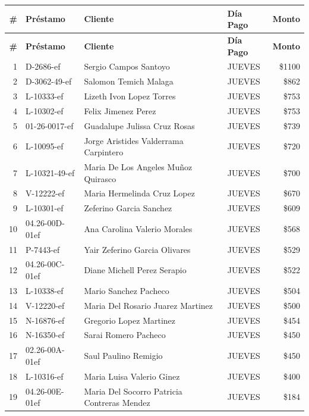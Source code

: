 \documentclass[11pt,a4paper]{article}
\newcommand{\money}[1]{\$\num{#1}}
\begin{document}
\begin{center}
\renewcommand{\arraystretch}{1.1}
\footnotesize
\begin{longtable}{rlp{6.5cm}lr}
\toprule
\textbf{\#} & \textbf{Pr\'estamo} & \textbf{Cliente} & \textbf{D\'ia Pago} & \textbf{Monto} \\
\midrule
\endfirsthead
\toprule
\textbf{\#} & \textbf{Pr\'estamo} & \textbf{Cliente} & \textbf{D\'ia Pago} & \textbf{Monto} \\
\midrule
\endhead
1 & D-2686-ef & Sergio Campos Santoyo & JUEVES & \money{1100} \\
2 & D-3062-49-ef & Salomon Temich Malaga & JUEVES & \money{862} \\
3 & L-10333-ef & Lizeth Ivon Lopez Torres & JUEVES & \money{753} \\
4 & L-10302-ef & Felix Jimenez Perez & JUEVES & \money{753} \\
5 & 01-26-0017-ef & Guadalupe Julissa Cruz Rosas & JUEVES & \money{739} \\
6 & L-10095-ef & Jorge Aristides Valderrama Carpintero & JUEVES & \money{720} \\
7 & L-10321-49-ef & Maria De Los Angeles Muñoz Quirasco & JUEVES & \money{700} \\
8 & V-12222-ef & Maria Hermelinda Cruz Lopez & JUEVES & \money{670} \\
9 & L-10301-ef & Zeferino Garcia Sanchez & JUEVES & \money{609} \\
10 & 04.26-00D-01ef & Ana Carolina Valerio Morales & JUEVES & \money{568} \\
11 & P-7443-ef & Yair Zeferino Garcia Olivares & JUEVES & \money{529} \\
12 & 04.26-00C-01ef & Diane Michell Perez Serapio & JUEVES & \money{522} \\
13 & L-10338-ef & Mario Sanchez Pacheco & JUEVES & \money{504} \\
14 & V-12220-ef & Maria Del Rosario Juarez Martinez & JUEVES & \money{500} \\
15 & N-16876-ef & Gregorio Lopez Martinez & JUEVES & \money{454} \\
16 & N-16350-ef & Sarai Romero Pacheco & JUEVES & \money{450} \\
17 & 02.26-00A-01ef & Saul Paulino Remigio & JUEVES & \money{450} \\
18 & L-10316-ef & Maria Luisa Valerio Ginez & JUEVES & \money{400} \\
19 & 04.26-00E-01ef & Maria Del Socorro Patricia Contreras Mendez & JUEVES & \money{184} \\

\bottomrule
\end{longtable}
\end{center}
\end{document}
